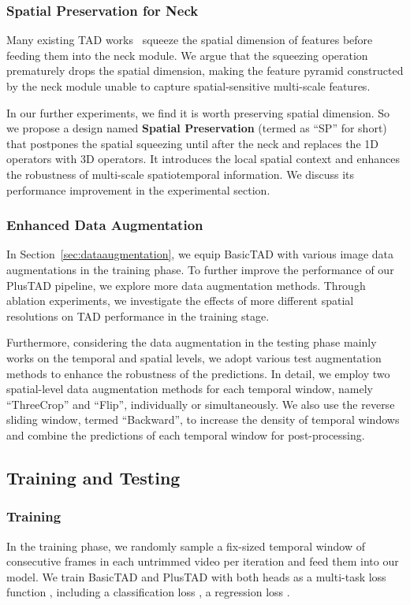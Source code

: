 \documentclass[a4paper,fleqn]{cas-dc}
\begin{document}
\subsubsection{Spatial Preservation for Neck}
\label{spatialpreservationforneck}
Many existing TAD works~\citep{afsd,rgb_enough} squeeze the spatial dimension of features before feeding them into the neck module. 
We argue that the squeezing operation prematurely drops the spatial dimension, making the feature pyramid constructed by the neck module unable to capture spatial-sensitive multi-scale features.

In our further experiments, we find it is worth preserving spatial dimension. 
So we propose a design named \textbf{Spatial Preservation} (termed as ``SP'' for short) that postpones the spatial squeezing until after the neck and replaces the 1D operators with 3D operators. 
It introduces the local spatial context and enhances the robustness of multi-scale spatiotemporal information. 
We discuss its performance improvement in the experimental section.
 


\subsubsection{Enhanced Data Augmentation} \label{detaileddataaugmentation}
In Section~\ref{sec:dataaugmentation}, we equip BasicTAD with various image data augmentations in the training phase.
To further improve the performance of our PlusTAD pipeline, we explore more data augmentation methods. Through ablation experiments, we investigate the effects of more different spatial resolutions on TAD performance in the training stage.

Furthermore, considering the data augmentation in the testing phase mainly works on the temporal and spatial levels, we adopt various test augmentation methods to enhance the robustness of the predictions. 
In detail, we employ two spatial-level data augmentation methods for each temporal window, namely ``ThreeCrop'' and ``Flip'', individually or simultaneously. 
We also use the reverse sliding window, termed ``Backward'', to increase the density of temporal windows and combine the predictions of each temporal window for post-processing.

\subsection{Training and Testing}
\subsubsection{Training} 
In the training phase, we randomly sample a fix-sized temporal window of consecutive frames in each untrimmed video per iteration and feed them into our model.
We train BasicTAD and PlusTAD with both heads as a multi-task loss function , including a classification loss  , a regression loss .
 
\end{document}
